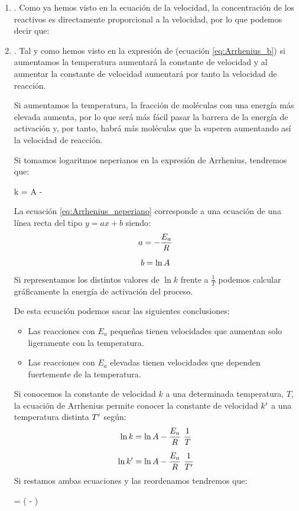 \begin{enumerate}[label=\numberballmDarkTeal]
        \item {}.
        Como ya hemos visto en la ecuación de la velocidad, la concentración de los reactivos es directamente proporcional a la velocidad, por lo que podemos decir que:
        \item {}.
        Tal y como hemos visto en la expresión de  (ecuación \eqref{eq:Arrhenius_b}) si aumentamos la temperatura aumentará la constante de velocidad y al aumentar la constante de velocidad aumentará por tanto la velocidad de reacción.

        Si aumentamos la temperatura, la fracción de moléculas con una energía más elevada aumenta, por lo que será más fácil pasar la barrera de la energía de activación y, por tanto, habrá más moléculas que la superen aumentando así la velocidad de reacción.

        Si tomamos logaritmos neperianos en la expresión de Arrhenius, tendremos que:
        \begin{centeredequation}
            \ln k = \ln A - \  \label{eq:Arrhenius_neperiano}
        \end{centeredequation}

        La ecuación \eqref{eq:Arrhenius_neperiano} corresponde a una ecuación de una línea recta del tipo $y = ax + b$ siendo:
        \begin{gather*}
            a = - \dfrac{E_a}{R}\separ
            b = \ln A
        \end{gather*}
        Si representamos los distintos valores de $\ln k$ frente a $\frac{1}{T}$ podemos calcular gráficamente la energía de activación del proceso.

        De esta ecuación podemos sacar las siguientes conclusiones:
        \begin{itemize}
            \item Las reacciones con $E_a$ pequeñas tienen velocidades que aumentan solo ligeramente con la temperatura.
            \item Las reacciones con $E_a$ elevadas tienen velocidades que dependen fuertemente de la temperatura.
        \end{itemize}
        Si conocemos la constante de velocidad $k$ a una determinada temperatura, $T$, la ecuación de Arrhenius permite conocer la constante de velocidad $k^\prime$ a una temperatura distinta $T^\prime$ según:
        \begin{gather*}
            \ln k = \ln A - \dfrac{E_a}{R}\ \dfrac{1}{T}\separ
            \ln k\prima = \ln A - \dfrac{E_a}{R}\ \dfrac{1}{T\prima}
        \end{gather*}
        Si restamos ambas ecuaciones y las reordenamos tendremos que:
        \begin{centeredequation}
            \ln{} = \biggl(  - \biggr)
        \end{centeredequation}


\end{enumerate}

